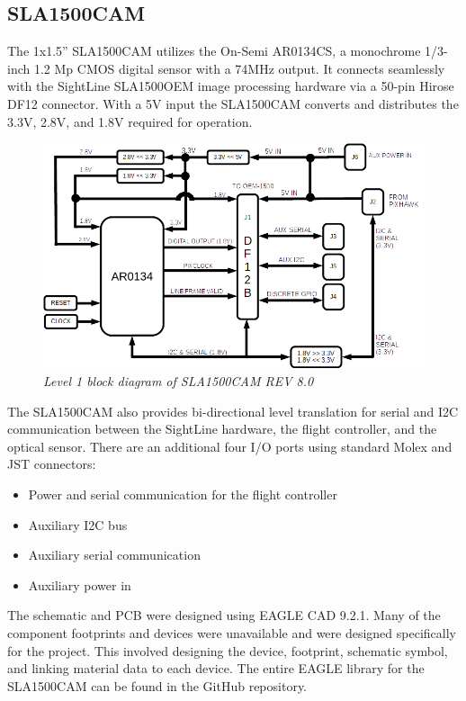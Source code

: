 \documentclass[11pt]{article}
\begin{document}
\newpage

\subsection{SLA1500CAM}

The 1x1.5” SLA1500CAM utilizes the On-Semi AR0134CS, a monochrome 1/3-inch 1.2 Mp CMOS digital sensor with a 74MHz output. It connects seamlessly with the SightLine SLA1500OEM image processing hardware via a 50-pin Hirose DF12 connector. With a 5V input the SLA1500CAM  converts and distributes the 3.3V, 2.8V, and 1.8V required for operation.



    \begin{figure}[H]
	\centering	
	\includegraphics[width=6 in]{LEVEL1_DIAGRAM_SCHEM_V2}
	\caption{\textit{Level 1 block diagram of SLA1500CAM REV 8.0}}	
	\end{figure}

The SLA1500CAM also provides bi-directional level translation for serial and I2C communication between the SightLine hardware, the flight controller, and the optical sensor. There are an additional four I/O ports using standard Molex and JST connectors: 

\begin{itemize}

\item Power and serial communication for the flight controller
\item Auxiliary I2C bus
\item Auxiliary serial communication
\item Auxiliary power in 

\end{itemize}

The schematic and PCB were designed using EAGLE CAD 9.2.1. Many of the component footprints and devices were unavailable and were designed specifically for the project. This involved designing the device, footprint, schematic symbol, and linking material data to each device. The entire EAGLE library for the SLA1500CAM can be found in the GitHub repository.
\end{document}
